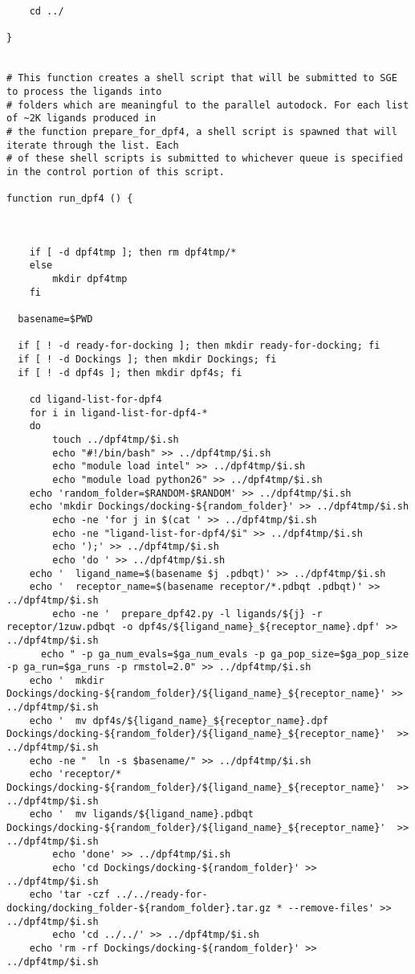 \begin{changemargin}{-0.5in}{0in}
\begin{lstlisting}
	cd ../

}


# This function creates a shell script that will be submitted to SGE to process the ligands into
# folders which are meaningful to the parallel autodock. For each list of ~2K ligands produced in  
# the function prepare_for_dpf4, a shell script is spawned that will iterate through the list. Each 
# of these shell scripts is submitted to whichever queue is specified in the control portion of this script.

function run_dpf4 () {


	
	if [ -d dpf4tmp ]; then rm dpf4tmp/*
	else
		mkdir dpf4tmp
	fi
	
  basename=$PWD

  if [ ! -d ready-for-docking ]; then mkdir ready-for-docking; fi
  if [ ! -d Dockings ]; then mkdir Dockings; fi
  if [ ! -d dpf4s ]; then mkdir dpf4s; fi

	cd ligand-list-for-dpf4
	for i in ligand-list-for-dpf4-*
	do
		touch ../dpf4tmp/$i.sh
		echo "#!/bin/bash" >> ../dpf4tmp/$i.sh
		echo "module load intel" >> ../dpf4tmp/$i.sh
		echo "module load python26" >> ../dpf4tmp/$i.sh
    echo 'random_folder=$RANDOM-$RANDOM' >> ../dpf4tmp/$i.sh
    echo 'mkdir Dockings/docking-${random_folder}' >> ../dpf4tmp/$i.sh
		echo -ne 'for j in $(cat ' >> ../dpf4tmp/$i.sh
		echo -ne "ligand-list-for-dpf4/$i" >> ../dpf4tmp/$i.sh
		echo ');' >> ../dpf4tmp/$i.sh
		echo 'do ' >> ../dpf4tmp/$i.sh
    echo '  ligand_name=$(basename $j .pdbqt)' >> ../dpf4tmp/$i.sh
    echo '  receptor_name=$(basename receptor/*.pdbqt .pdbqt)' >> ../dpf4tmp/$i.sh
		echo -ne '  prepare_dpf42.py -l ligands/${j} -r receptor/1zuw.pdbqt -o dpf4s/${ligand_name}_${receptor_name}.dpf' >> ../dpf4tmp/$i.sh
	  echo " -p ga_num_evals=$ga_num_evals -p ga_pop_size=$ga_pop_size -p ga_run=$ga_runs -p rmstol=2.0" >> ../dpf4tmp/$i.sh
    echo '  mkdir Dockings/docking-${random_folder}/${ligand_name}_${receptor_name}' >> ../dpf4tmp/$i.sh
    echo '  mv dpf4s/${ligand_name}_${receptor_name}.dpf Dockings/docking-${random_folder}/${ligand_name}_${receptor_name}'  >> ../dpf4tmp/$i.sh
    echo -ne "  ln -s $basename/" >> ../dpf4tmp/$i.sh
    echo 'receptor/* Dockings/docking-${random_folder}/${ligand_name}_${receptor_name}'  >> ../dpf4tmp/$i.sh
    echo '  mv ligands/${ligand_name}.pdbqt Dockings/docking-${random_folder}/${ligand_name}_${receptor_name}'  >> ../dpf4tmp/$i.sh
		echo 'done' >> ../dpf4tmp/$i.sh
		echo 'cd Dockings/docking-${random_folder}' >> ../dpf4tmp/$i.sh
    echo 'tar -czf ../../ready-for-docking/docking_folder-${random_folder}.tar.gz * --remove-files' >> ../dpf4tmp/$i.sh
		echo 'cd ../../' >> ../dpf4tmp/$i.sh
    echo 'rm -rf Dockings/docking-${random_folder}' >> ../dpf4tmp/$i.sh
    

\end{lstlisting}
\end{changemargin}

